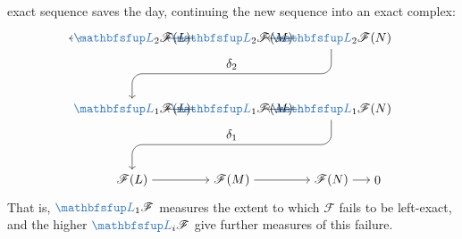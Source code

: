 exact sequence saves the day, continuing the new sequence into an
exact complex:
\[
  \begin{tikzpicture}[baseline=(current bounding box.center)]
    \node (dots) at (-1.3,4)
    {$\dots$}; \node (L2L) at (0,4)
    {$\categ{L}_2\mathscr{F}(L)$}; \node (L2M) at (2.8,4)
    {$\categ{L}_2\mathscr{F}(M)$}; \node (L2N) at (5.6,4)
    {$\categ{L}_2\mathscr{F}(N)$}; \node (L1L) at (0,2)
    {$\categ{L}_1\mathscr{F}(L)$}; \node (L1M) at (2.8,2)
    {$\categ{L}_1\mathscr{F}(M)$}; \node (L1N) at (5.6,2)
    {$\categ{L}_1\mathscr{F}(N)$}; \node (FL) at (0,0)
    {$\mathscr{F}(L)$}; \node (FM) at (2.8,0)
    {$\mathscr{F}(M)$}; \node (FN) at (5.6,0)
    {$\mathscr{F}(N)$}; \node (zero) at (6.9,0)
    {$0$}; \draw[->] (dots) -- (L2L); \draw[->] (L2L) -- (L2M);
    \draw[->] (L2M) -- (L2N); \draw[->] (L1L) -- (L1M); \draw[->]
    (L1M) -- (L1N); \draw[->] (FL) -- (FM); \draw[->] (FM) -- (FN);
    \draw[->] (FN) -- (zero); \draw[->, rounded corners=8pt]
    (L2N.south) -- (5.6,3) -- node[above]
    {$\delta_2$} (0,3) -- (L1L.north); \draw[->, rounded corners=8pt]
    (L1N.south) -- (5.6,1) -- node[above]
    {$\delta_1$} (0,1) -- (FL.north);
  \end{tikzpicture}
\]
That is, $\categ{L}_1\mathscr{F}$ measures the extent to which
$\mathscr{F}$ fails to be left-exact, and the higher
$\categ{L}_i\mathscr{F}$ give further measures of this failure.

